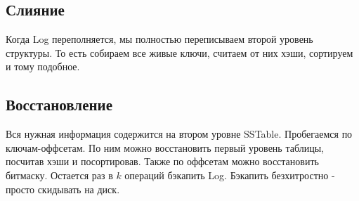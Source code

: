 \subsection*{Слияние}
Когда Log переполняется, мы полностью переписываем второй уровень структуры. То есть собираем все живые ключи, считаем от них хэши, сортируем и тому подобное.

\subsection*{Восстановление}
Вся нужная информация содержится на втором уровне SSTable. Пробегаемся по ключам-оффсетам. По ним можно восстановить первый уровень таблицы, посчитав хэши и посортировав. Также по оффсетам можно 
восстановить битмаску. Остается раз в $k$ операций бэкапить Log. Бэкапить безхитростно - просто скидывать на диск.




